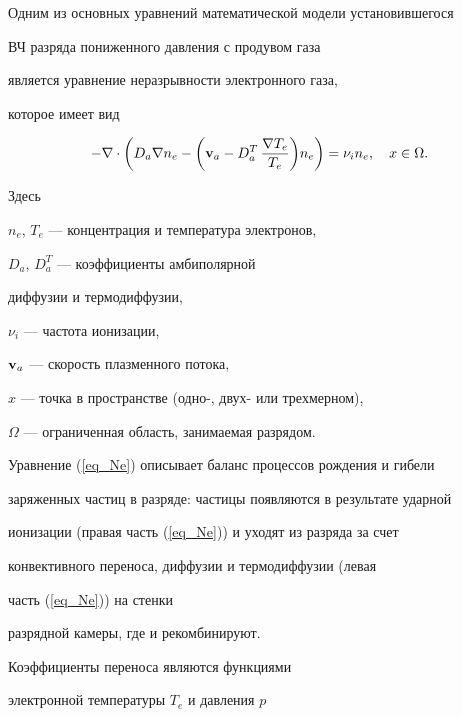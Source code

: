 Одним из основных уравнений математической модели установившегося 


ВЧ разряда пониженного давления с продувом газа \cite{ZltZhelt}


является уравнение неразрывности электронного газа, 


которое имеет вид 


\begin{equation}


\label{eq_Ne}


 - \nabla \cdot 


\bigg(D_a \nabla n_{e} - 


\bigg({\bold v}_a - D_a^T \, \frac{ \nabla T_e}{ T_e} 


\bigg)n_{e} \bigg) = \nu_{i} n_{e}, \quad x\in \Omega. 


\end{equation}


Здесь 


$n_{e}$, $T_{e}$ --- концентрация и температура электронов, 


$ D_{a}$, $ D_{a}^{T}$ --- коэффициенты амбиполярной


диффузии и термодиффузии, 


$\nu_{i} $ --- частота ионизации, 


${{\bold v}_a}$ --- скорость плазменного потока, \linebreak


$x$ --- точка в пространстве (одно-, двух- или трехмерном), 


$\Omega $ --- ограниченная область, занимаемая разрядом. 





Уравнение (\ref{eq_Ne}) описывает баланс процессов рождения и гибели


заряженных частиц в разряде: частицы появляются в результате ударной


ионизации (правая часть (\ref{eq_Ne})) и уходят из разряда за счет


конвективного переноса, диффузии и термодиффузии (левая


часть (\ref{eq_Ne})) на стенки


разрядной камеры, где и рекомбинируют.





Коэффициенты переноса являются функциями 


электронной температуры $T_e$ и давления $p$


